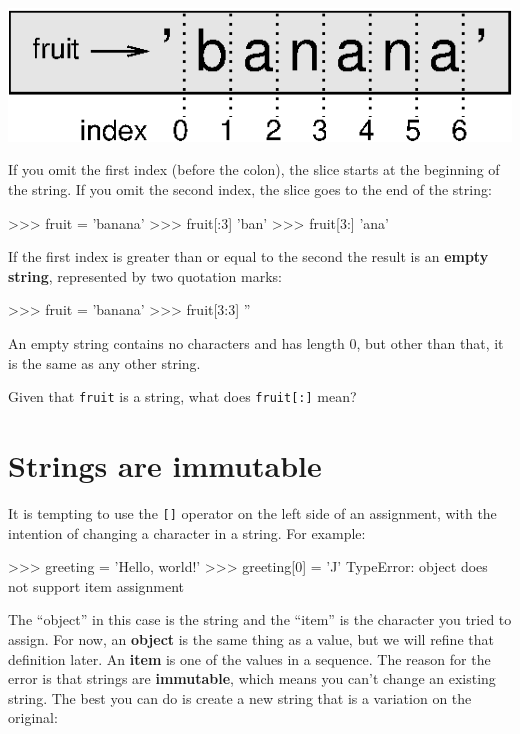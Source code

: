\beforefig
\centerline{\includegraphics{figs/banana.eps}}
\afterfig

If you omit the first index (before the colon), the slice starts at
the beginning of the string.  If you omit the second index, the slice
goes to the end of the string:

\beforeverb
\begin{pycode}
>>> fruit = 'banana'
>>> fruit[:3]
'ban'
>>> fruit[3:]
'ana'
\end{pycode}
\afterverb
%
If the first index is greater than or equal to the second the result
is an {\bf empty string}, represented by two quotation marks:


\beforeverb
\begin{pycode}
>>> fruit = 'banana'
>>> fruit[3:3]
''
\end{pycode}
\afterverb
%
An empty string contains no characters and has length 0, but other
than that, it is the same as any other string.

\begin{exercise}
Given that {\tt fruit} is a string, what does
{\tt fruit[:]} mean?



\end{exercise}


\section{Strings are immutable}

It is tempting to use the {\tt []} operator on the left side of an
assignment, with the intention of changing a character in a string.
For example:


\beforeverb
\begin{pycode}
>>> greeting = 'Hello, world!'
>>> greeting[0] = 'J'
TypeError: object does not support item assignment
\end{pycode}
\afterverb
%
The ``object'' in this case is the string and the ``item'' is
the character you tried to assign.  For now, an {\bf object} is
the same thing as a value, but we will refine that definition
later.  An {\bf item} is one of the values in a sequence.
%
%
The reason for the error is that
strings are {\bf immutable}, which means you can't change an
existing string.  The best you can do is create a new string
that is a variation on the original:

